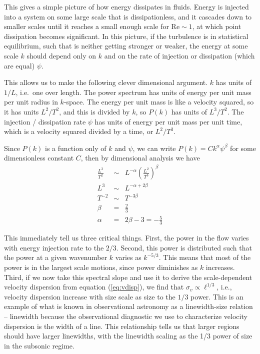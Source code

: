 This gives a simple picture of how energy dissipates in fluids. Energy is injected into a system on some large scale that is dissipationless, and it cascades down to smaller scales until it reaches a small enough scale for $\mbox{Re}\sim 1$, at which point dissipation becomes significant. In this picture, if the turbulence is in statistical equilibrium, such that is neither getting stronger or weaker, the energy at some scale $k$ should depend only on $k$ and on the rate of injection or dissipation (which are equal) $\psi$.

This allows us to make the following clever dimensional argument. $k$ has units of $1/L$, i.e.\ one over length. The power spectrum has units of energy per unit mass per unit radius in $k$-space. The energy per unit mass is like a velocity squared, so it has units $L^2/T^2$, and this is divided by $k$, so $P(k)$ has units of $L^3/T^2$. The injection / dissipation rate $\psi$ has units of energy per unit mass per unit time, which is a velocity squared divided by a time, or $L^2/T^3$.

Since $P(k)$ is a function only of $k$ and $\psi$, we can write $P(k) = C k^\alpha \psi^\beta$ for some dimensionless constant $C$, then by dimensional analysis we have
\begin{eqnarray}
\frac{L^3}{T^2} & \sim & L^{-\alpha} \left(\frac{L^2}{T^3}\right)^\beta \\
L^3 & \sim & L^{-\alpha+2\beta} \\
T^{-2} & \sim & T^{-3\beta}\\
\beta & = & \frac{2}{3} \\
\alpha & = & 2\beta - 3 = -\frac{5}{3}
\end{eqnarray}

This immediately tell us three critical things. First, the power in the flow varies with energy injection rate to the $2/3$. Second, this power is distributed such that the power at a given wavenumber $k$ varies as $k^{-5/3}$. This means that most of the power is in the largest scale motions, since power diminishes as $k$ increases. Third, if we now take this spectral slope and use it to derive the scale-dependent velocity dispersion from equation (\ref{eq:vdisp}), we find that $\sigma_v \propto \ell^{1/3}$, i.e., velocity dispersion increase with size scale as size to the $1/3$ power. This is an example of what is known in observational astronomy as a linewidth-size relation -- linewidth because the observational diagnostic we use to characterize velocity dispersion is the width of a line. This relationship tells us that larger regions should have larger linewidths, with the linewidth scaling as the 1/3 power of size in the subsonic regime.

